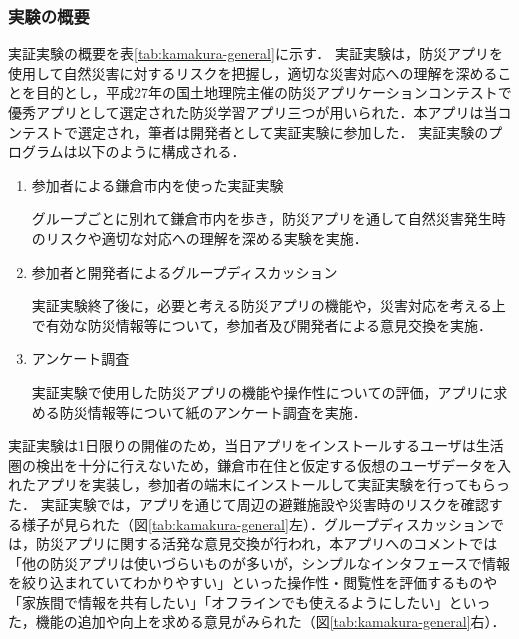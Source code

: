 \documentclass[a4paper]{jsarticle}
\begin{document}
\subsubsection{実験の概要}
実証実験の概要を表\ref{tab:kamakura-general}に示す．
実証実験は，防災アプリを使用して自然災害に対するリスクを把握し，適切な災害対応への理解を深めることを目的とし，平成27年の国土地理院主催の防災アプリケーションコンテストで優秀アプリとして選定された防災学習アプリ三つが用いられた．本アプリは当コンテストで選定され，筆者は開発者として実証実験に参加した．
実証実験のプログラムは以下のように構成される．

\begin{enumerate}
  \item 参加者による鎌倉市内を使った実証実験

  グループごとに別れて鎌倉市内を歩き，防災アプリを通して自然災害発生時のリスクや適切な対応への理解を深める実験を実施．

  \item 参加者と開発者によるグループディスカッション

  実証実験終了後に，必要と考える防災アプリの機能や，災害対応を考える上で有効な防災情報等について，参加者及び開発者による意見交換を実施．

  \item アンケート調査

  実証実験で使用した防災アプリの機能や操作性についての評価，アプリに求める防災情報等について紙のアンケート調査を実施．

\end{enumerate}

実証実験は1日限りの開催のため，当日アプリをインストールするユーザは生活圏の検出を十分に行えないため，鎌倉市在住と仮定する仮想のユーザデータを入れたアプリを実装し，参加者の端末にインストールして実証実験を行ってもらった．
実証実験では，アプリを通じて周辺の避難施設や災害時のリスクを確認する様子が見られた（図\ref{tab:kamakura-general}左）．グループディスカッションでは，防災アプリに関する活発な意見交換が行われ，本アプリへのコメントでは「他の防災アプリは使いづらいものが多いが，シンプルなインタフェースで情報を絞り込まれていてわかりやすい」といった操作性・閲覧性を評価するものや「家族間で情報を共有したい」「オフラインでも使えるようにしたい」といった，機能の追加や向上を求める意見がみられた（図\ref{tab:kamakura-general}右）．
\end{document}
